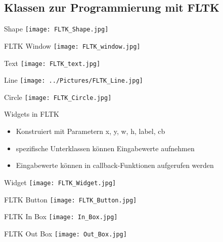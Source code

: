 \documentclass{beamer}
\begin{document}
\subsection{Klassen zur Programmierung mit FLTK}
\begin{frame}{Shape}
\texttt{[image: FLTK\_Shape.jpg]} 
\end{frame}

\begin{frame}{FLTK Window}
\texttt{[image: FLTK\_window.jpg]} 
\end{frame}

\begin{frame}{Text}
\texttt{[image: FLTK\_text.jpg]}  
\end{frame}

\begin{frame}{Line}
\texttt{[image: ../Pictures/FLTK\_Line.jpg]} 
\end{frame}

\begin{frame}{Circle}
\texttt{[image: FLTK\_Circle.jpg]} 
\end{frame}

\begin{frame}{Widgets in FLTK}
\begin{itemize}
\item Konstruiert mit Parametern x, y, w, h, label, cb
\item spezifische Unterklassen können Eingabewerte aufnehmen
\item Eingabewerte können in callback-Funktionen aufgerufen werden
\end{itemize}
\end{frame}

\begin{frame}{Widget}
\texttt{[image: FLTK\_Widget.jpg]} 
\end{frame}

\begin{frame}{FLTK Button}
\texttt{[image: FLTK\_Button.jpg]} 
\end{frame}

\begin{frame}{FLTK In Box}
\texttt{[image: In\_Box.jpg]} 
\end{frame}

\begin{frame}{FLTK Out Box}
\texttt{[image: Out\_Box.jpg]} 
\end{frame}
\end{document}
